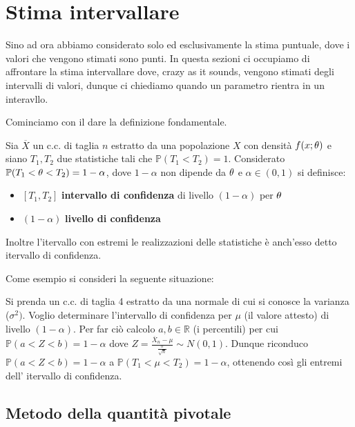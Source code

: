 \section{Stima intervallare}

Sino ad ora abbiamo considerato solo ed esclusivamente la stima puntuale, dove i valori che vengono stimati sono punti. In questa sezioni ci occupiamo di affrontare la stima intervallare dove, crazy as it sounds, vengono stimati degli intervalli di valori, dunque ci chiediamo quando un parametro rientra in un interavllo.

Cominciamo con il dare la definizione fondamentale.

\begin{definition}
Sia $\overline{X}$ un c.c. di taglia $n$ estratto da una popolazione $X$ con densità $f(x;\theta)$ e siano $T_1,T_2$ due statistiche tali che $\mathbb{P}(T_1<T_2)=1$. Considerato $\mathbb{P}(T_1<\theta<T_2)=1-\alpha$, dove $1-\alpha$ non dipende da $\theta$ e $\alpha\in(0,1)$ si definisce:
\begin{itemize}
    \item $[T_1,T_2]$ \textbf{intervallo di confidenza} di livello $(1-\alpha)$ per $\theta$
    \item $(1-\alpha)$ \textbf{livello di confidenza}
\end{itemize}
Inoltre l'itervallo con estremi le realizzazioni delle statistiche è anch'esso detto itervallo di confidenza.
\end{definition}

\vspace{5px}
\noindent
Come esempio si consideri la seguente situazione:

Si prenda un c.c. di taglia 4 estratto da una normale di cui si conosce la varianza ($\sigma^2)$. Voglio determinare l'intervallo di confidenza per $\mu$ (il valore attesto) di livello $(1-\alpha)$. Per far ciò calcolo $a,b\in\mathbb{R}$ (i percentili) per cui $\mathbb{P}(a<Z<b)=1-\alpha$ dove $Z=\frac{\overline{X}_n-\mu}{\frac{\sigma}{\sqrt{n}}}\sim N(0,1)$. Dunque riconduco \newline $\mathbb{P}(a<Z<b)=1-\alpha$ a $\mathbb{P}(T_1<\mu<T_2)=1-\alpha$, ottenendo così gli entremi dell' itervallo di confidenza.

\vspace{10px}

\subsection{Metodo della quantità pivotale}

